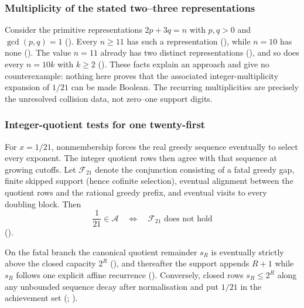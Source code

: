 \subsubsection{Multiplicity of the stated two--three representations}

Consider the primitive representations $2p+3q=n$ with $p,q>0$ and $\gcd(p,q)=1$
().  Every $n\ge11$
has such a representation
(),
while $n=10$ has none
().
The value $n=11$ already has two distinct representations
(),
and so does every $n=10k$ with $k\ge2$
().
These facts explain an approach and give no counterexample: nothing here proves
that the associated integer-multiplicity expansion of $1/21$ can be made Boolean.  The recurring multiplicities are precisely
the unresolved collision data, not zero--one support digits.

\subsubsection{Integer-quotient tests for one twenty-first}

For $x=1/21$, nonmembership forces the real greedy sequence eventually
to select every exponent. The integer quotient rows then agree with
that sequence at growing cutoffs. Let
$\mathcal F_{21}$ denote the conjunction consisting
of a fatal greedy gap, finite skipped support (hence cofinite selection),
eventual alignment between the quotient rows and the rational greedy prefix,
and eventual visits to every doubling block.  Then
\[
 \frac1{21}\in\ensuremath{\mathcal A}
 \quad\Longleftrightarrow\quad
 \text{$\mathcal F_{21}$ does not hold}
\]
().

On the fatal branch the canonical quotient remainder $s_R$ is eventually
strictly above the closed capacity $2^R$
(),
and thereafter the support appends $R+1$ while $s_R$ follows one explicit
affine recurrence
().
Conversely, closed rows $s_R\le2^R$ along any unbounded sequence decay after
normalisation and put $1/21$ in the achievement set
(;
).


